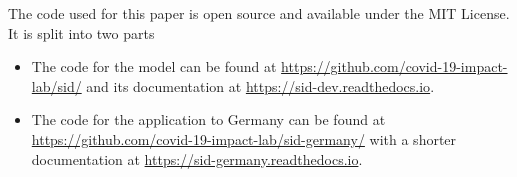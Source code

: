 The code used for this paper is open source and available under the MIT License. It is
split into two parts
\begin{itemize}
    \item The code for the model can be found at
   \href{https://github.com/covid-19-impact-lab/sid/}{https://github.com/covid-19-impact-lab/sid/}
   and its documentation at
   \href{https://sid-dev.readthedocs.io}{https://sid-dev.readthedocs.io}.
   \item The code for the application to Germany can be found at
   \href{https://github.com/covid-19-impact-lab/sid-germany/}{https://github.com/covid-19-impact-lab/sid-germany/}
   with a shorter documentation at
   \href{https://sid-germany.readthedocs.io}{https://sid-germany.readthedocs.io}.
\end{itemize} 

